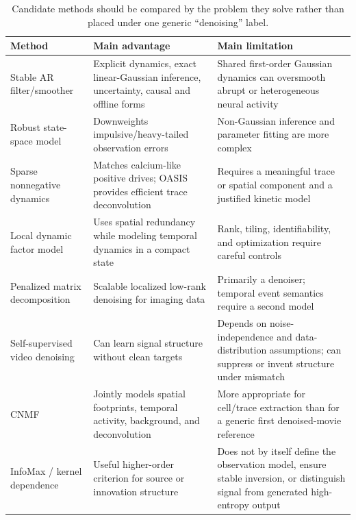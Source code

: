 \documentclass[11pt]{article}
\begin{document}
\begin{table}[h]
\centering
\small
\begin{tabularx}{\textwidth}{>{\raggedright\arraybackslash}p{}
                            >{\raggedright\arraybackslash}X
                            >{\raggedright\arraybackslash}X}
\toprule
Method & Main advantage & Main limitation \\
\midrule
Stable AR filter/smoother
& Explicit dynamics, exact linear-Gaussian inference, uncertainty, causal and
  offline forms
& Shared first-order Gaussian dynamics can oversmooth abrupt or heterogeneous
  neural activity \\
Robust state-space model
& Downweights impulsive/heavy-tailed observation errors
& Non-Gaussian inference and parameter fitting are more complex \\
Sparse nonnegative dynamics
& Matches calcium-like positive drives; OASIS provides efficient trace
  deconvolution~\cite{friedrich2017oasis}
& Requires a meaningful trace or spatial component and a justified kinetic
  model \\
Local dynamic factor model
& Uses spatial redundancy while modeling temporal dynamics in a compact state
& Rank, tiling, identifiability, and optimization require careful controls \\
Penalized matrix decomposition
& Scalable localized low-rank denoising for imaging data
  \cite{buchanan2018pmd}
& Primarily a denoiser; temporal event semantics require a second model \\
Self-supervised video denoising
& Can learn signal structure without clean targets
  \cite{batson2019noise2self,lecoq2021deepinterpolation}
& Depends on noise-independence and data-distribution assumptions; can suppress
  or invent structure under mismatch \\
CNMF
& Jointly models spatial footprints, temporal activity, background, and
  deconvolution~\cite{pnevmatikakis2016cnmf}
& More appropriate for cell/trace extraction than for a generic first
  denoised-movie reference \\
InfoMax / kernel dependence
& Useful higher-order criterion for source or innovation structure
& Does not by itself define the observation model, ensure stable inversion, or
  distinguish signal from generated high-entropy output \\
\bottomrule
\end{tabularx}
\caption{Candidate methods should be compared by the problem they solve rather
than placed under one generic ``denoising'' label.}
\label{tab:methods}
\end{table}
\end{document}
